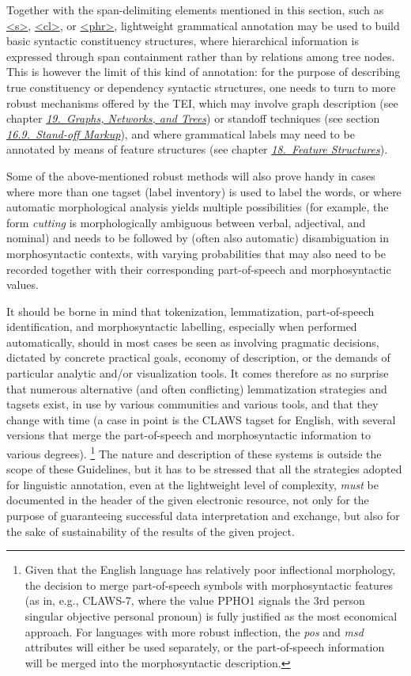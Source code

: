 Together with the span-delimiting elements mentioned in this section, such as \hyperref[TEI.s]{<s>}, \hyperref[TEI.cl]{<cl>}, or \hyperref[TEI.phr]{<phr>}, lightweight grammatical annotation may be used to build basic syntactic constituency structures, where hierarchical information is expressed through span containment rather than by relations among tree nodes. This is however the limit of this kind of annotation: for the purpose of describing true constituency or dependency syntactic structures, one needs to turn to more robust mechanisms offered by the TEI, which may involve graph description (see chapter \textit{\hyperref[GD]{19.\ Graphs, Networks, and Trees}}) or standoff techniques (see section \textit{\hyperref[SASO]{16.9.\ Stand-off Markup}}), and where grammatical labels may need to be annotated by means of feature structures (see chapter \textit{\hyperref[FS]{18.\ Feature Structures}}).\par
Some of the above-mentioned robust methods will also prove handy in cases where more than one tagset (label inventory) is used to label the words, or where automatic morphological analysis yields multiple possibilities (for example, the form \textit{cutting} is morphologically ambiguous between verbal, adjectival, and nominal) and needs to be followed by (often also automatic) disambiguation in morphosyntactic contexts, with varying probabilities that may also need to be recorded together with their corresponding part-of-speech and morphosyntactic values.\par
It should be borne in mind that tokenization, lemmatization, part-of-speech identification, and morphosyntactic labelling, especially when performed automatically, should in most cases be seen as involving pragmatic decisions, dictated by concrete practical goals, economy of description, or the demands of particular analytic and/or visualization tools. It comes therefore as no surprise that numerous alternative (and often conflicting) lemmatization strategies and tagsets exist, in use by various communities and various tools, and that they change with time (a case in point is the CLAWS tagset for English, with several versions that merge the part-of-speech and morphosyntactic information to various degrees). \footnote{Given that the English language has relatively poor inflectional morphology, the decision to merge part-of-speech symbols with morphosyntactic features (as in, e.g., CLAWS-7, where the value PPHO1 signals the 3rd person singular objective personal pronoun) is fully justified as the most economical approach. For languages with more robust inflection, the {\itshape pos} and {\itshape msd} attributes will either be used separately, or the part-of-speech information will be merged into the morphosyntactic description.} The nature and description of these systems is outside the scope of these Guidelines, but it has to be stressed that all the strategies adopted for linguistic annotation, even at the lightweight level of complexity, \textit{must} be documented in the header of the given electronic resource, not only for the purpose of guaranteeing successful data interpretation and exchange, but also for the sake of sustainability of the results of the given project.\par
